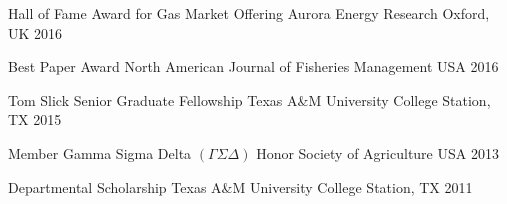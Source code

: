 
\begin{cvhonors}

  \cvhonor
    {Hall of Fame Award for Gas Market Offering} %
    {Aurora Energy Research} %
    {Oxford, UK} %
    {2016} %

  \cvhonor
    {Best Paper Award} %
    {North American Journal of Fisheries Management} %
    {USA} %
    {2016} %

  \cvhonor
    {Tom Slick Senior Graduate Fellowship} %
    {Texas A\&M University} %
    {College Station, TX} %
    {2015} %

  \cvhonor
    {Member} %
    {Gamma Sigma Delta $(\Gamma \Sigma \Delta)$ Honor Society of Agriculture} %
    {USA} %
    {2013} %

  \cvhonor
    {Departmental Scholarship} %
    {Texas A\&M University} %
    {College Station, TX} %
    {2011} %

\end{cvhonors}
